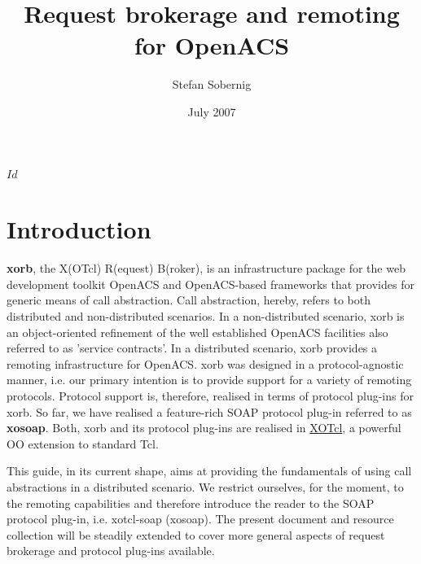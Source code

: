 

\makeindex
  
  \svnInfo $Id$
\title{Request brokerage and remoting for OpenACS}
\author{Stefan Sobernig}
\date{July 2007}
\maketitle

     \section{Introduction}
        \textbf{xorb}, the X(OTcl) R(equest) B(roker), is an 
infrastructure package for the web development toolkit OpenACS and OpenACS-based frameworks that 
provides for generic means of call abstraction.  Call abstraction, hereby, refers to both distributed and 
non-distributed scenarios. In a non-distributed scenario, xorb is an object-oriented refinement of the well 
established OpenACS facilities also referred to as 'service contracts'. In a distributed scenario, xorb 
provides a remoting infrastructure for OpenACS. xorb was designed in a protocol-agnostic manner, i.e. 
our primary intention is to provide support for a variety of remoting protocols. Protocol support is, 
therefore, realised in terms of protocol plug-ins for xorb. So far, we have realised a feature-rich SOAP 
protocol plug-in referred to as \textbf{xosoap}. Both, xorb and its protocol plug-ins are realised in \href{http://media.wu-wien.ac.at/}{XOTcl}, a powerful OO extension to standard Tcl.

This guide, in its current shape, aims at providing the fundamentals of using call abstractions in a 
distributed scenario. We restrict ourselves, for the moment, to the remoting capabilities and therefore 
introduce the reader to the SOAP protocol plug-in, i.e. xotcl-soap (xosoap). The present document and 
resource collection will be steadily extended to cover more general aspects of request brokerage and 
protocol plug-ins available.
